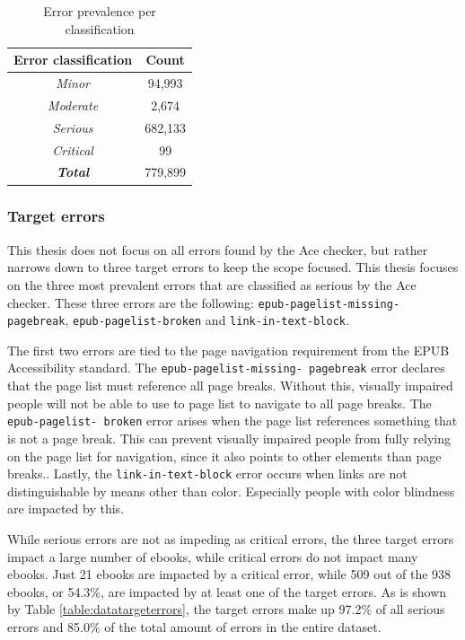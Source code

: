 \begin{table}[h!]
\begin{center}
\begin{tabular}{ | c | c |} 
\hline
\textbf{Error classification} & \textbf{Count} \\
\hline
\textit{Minor} & 94,993 \\
\hline
\textit{Moderate} & 2,674 \\
\hline
\textit{Serious} & 682,133 \\
\hline
\textit{Critical} & 99 \\
\hline
\hline
\textit{\textbf{Total}} & 779,899 \\
\hline
\end{tabular}
\end{center}
\normalsize
\caption{Error prevalence per classification}
\label{table:errorclassesamounts}
\end{table}


\subsubsection{Target errors}
This thesis does not focus on all errors found by the Ace checker, but rather narrows down to three target errors to keep the scope focused. This thesis focuses on the three most prevalent errors that are classified as serious by the Ace checker. These three errors are the following: \texttt{epub-pagelist-missing-
pagebreak}, \texttt{epub-pagelist-broken} and \texttt{link-in-text-block}. 

The first two errors are tied to the page navigation requirement from the EPUB Accessibility standard. The \texttt{epub-pagelist-missing-
pagebreak} error declares that the page list must reference all page breaks. Without this, visually impaired people will not be able to use to page list to navigate to all page breaks. The \texttt{epub-pagelist-
broken} error arises when the page list references something that is not a page break. This can prevent visually impaired people from fully relying on the page list for navigation, since it also points to other elements than page breaks.. Lastly, the \texttt{link-in-text-block} error occurs when links are not distinguishable by means other than color. Especially people with color blindness are impacted by this.

While serious errors are not as impeding as critical errors, the three target errors impact a large number of ebooks, while critical errors do not impact many ebooks. Just 21 ebooks are impacted by a critical error, while 509 out of the 938 ebooks, or 54.3\%, are impacted by at least one of the target errors. As is shown by Table \ref{table:datatargeterrors}, the target errors make up 97.2\% of all serious errors and 85.0\% of the total amount of errors in the entire dataset.

